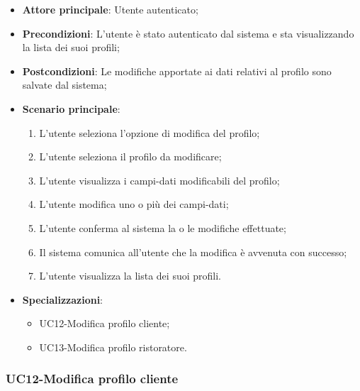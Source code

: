 \begin{itemize}
\item \textbf{Attore principale}: Utente autenticato;
\item \textbf{Precondizioni}: L'utente è stato autenticato dal sistema e sta visualizzando la lista dei suoi profili;
\item \textbf{Postcondizioni}: Le modifiche apportate ai dati relativi al profilo sono salvate dal sistema;
\item \textbf{Scenario principale}:
\begin{enumerate}
\item L'utente seleziona l'opzione di modifica del profilo;
\item L'utente seleziona il profilo da modificare;
\item L'utente visualizza i campi-dati modificabili del profilo;
\item L'utente modifica uno o più dei campi-dati;
\item L'utente conferma al sistema la o le modifiche effettuate;
\item Il sistema comunica all'utente che la modifica è avvenuta con successo;
\item L'utente visualizza la lista dei suoi profili.
\end{enumerate}
\item \textbf{Specializzazioni}:
\begin{itemize}
\item UC12-Modifica profilo cliente;
\item UC13-Modifica profilo ristoratore.
\end{itemize}
\end{itemize}

\subsubsection{UC12-Modifica profilo cliente}

